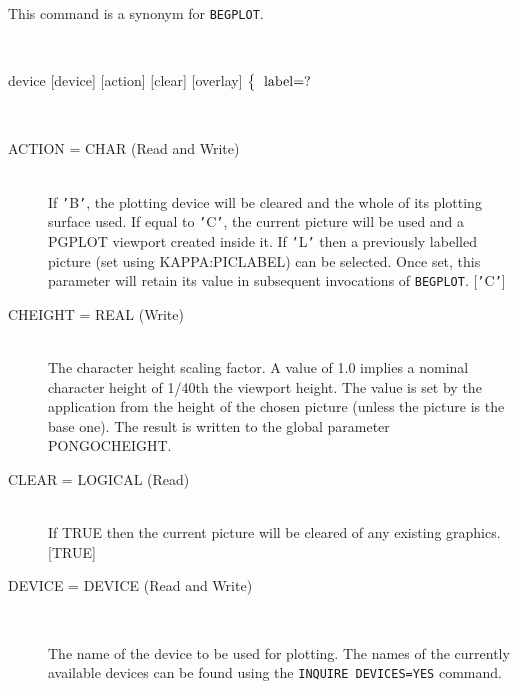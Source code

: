 \documentclass[twoside,11pt]{article}
\newcommand{\htmlref}[2]{#1}
\renewcommand{\_}{\texttt{\symbol{95}}}
\newcommand{\cnam}[1]{{\tt #1}}
\newcommand{\iref} [1]{\htmlref{#1}{#1}}
\newcommand{\sstusage}[1]{\item[Usage:] \mbox{}
\\[1.3ex]{\raggedright \ssttt #1}}
\newcommand{\sstparameters}[1]{
   \item[Parameters:] \mbox{} \\
   \vspace{-3.5ex}
   \begin{description}
      #1
   \end{description}
}
\newcommand{\sstsubsection}[1]{ \item[{#1}] \mbox{} \\}
\newcommand{\sstusage}[1]{\item[Usage:]
      \begin{description}
         {\ssttt #1}
      \end{description}
      \\
   }
\newcommand{\sstparameters}[1]{
      \item[Parameters:] \\
      \begin{description}
         #1
      \end{description}
      \\
   }
\newcommand{\sstsubsection}[1]{\item[{#1}]}
\begin{document}
{{      This command is a synonym for \cnam{\iref{BEGPLOT}}.
   }
   \sstusage {
      device [device] [action] [clear] [overlay]
        \newline\hspace*{1.5em}
        $\left\{ {\begin{tabular}{l}
                                      label=? \\
                  \end{tabular} }
        \right.$
        \newline\hspace*{1.9em}
        \makebox[0mm][c]{\small action}
   }
   \sstparameters{
      \sstsubsection{
         ACTION = \_CHAR (Read and Write)
      }{
         If {\tt '}B{\tt '}, the plotting device will be cleared and the whole of
         its plotting surface used. If equal to {\tt '}C{\tt '}, the current picture
         will be used and a PGPLOT viewport created inside it. If {\tt '}L{\tt '}
         then a previously labelled picture (set using KAPPA:PICLABEL)
         can be selected. Once set, this parameter will retain its value
         in subsequent invocations of \cnam{\iref{BEGPLOT}}.
         [{\tt '}C{\tt '}]
      }
      \sstsubsection{
         CHEIGHT = \_REAL (Write)
      }{
         The character height scaling factor. A value of 1.0 implies a
         nominal character height of 1/40th the viewport height. The
         value is set by the application from the height of the chosen
         picture (unless the picture is the base one). The result is
         written to the global parameter PONGO\_CHEIGHT.
      }
      \sstsubsection{
         CLEAR = \_LOGICAL (Read)
      }{
         If TRUE then the current picture will be cleared of any
         existing graphics.
         [TRUE]
      }
      \sstsubsection{
         DEVICE = DEVICE (Read and Write)
      }{
         The name of the device to be used for plotting.  The names of
         the currently available devices can be found using the
         \cnam{\iref{INQUIRE} DEVICES=YES} command.

}}}
\end{document}

